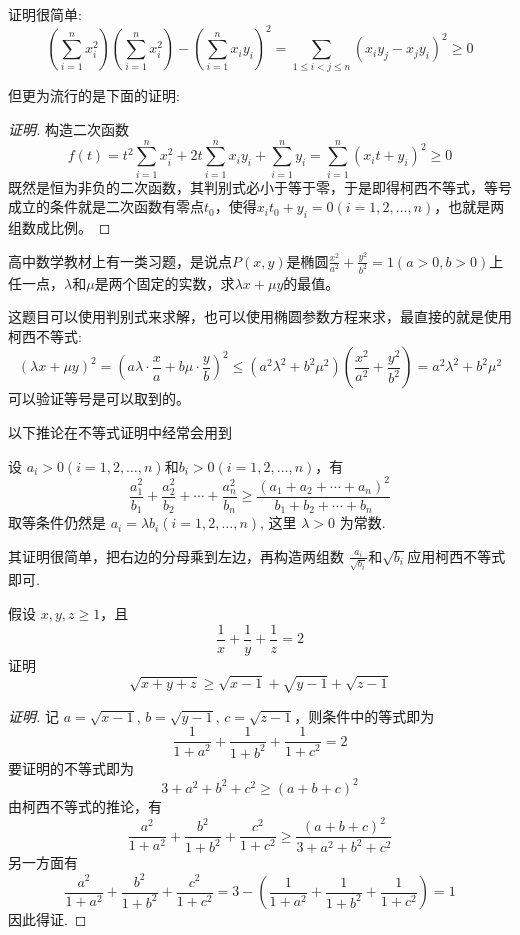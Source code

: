 证明很简单:
\begin{equation*}
  \left( \sum_{i=1}^nx_i^2 \right) \left( \sum_{i=1}^nx_i^2 \right) - \left( \sum_{i=1}^nx_iy_i \right)^2 = \sum_{1 \leqslant i < j \leqslant n}(x_iy_j-x_jy_i)^2 \geqslant 0
\end{equation*}

但更为流行的是下面的证明:

\begin{proof}[证明]
  构造二次函数
  \begin{equation*}
  f(t)=t^2\sum_{i=1}^nx_i^2+2t\sum_{i=1}^nx_iy_i+\sum_{i=1}^ny_i=\sum_{i=1}^n(x_it+y_i)^2 \geqslant 0
  \end{equation*}
 既然是恒为非负的二次函数，其判别式必小于等于零，于是即得柯西不等式，等号成立的条件就是二次函数有零点$t_0$，使得$x_it_0+y_i=0(i=1,2,\ldots,n)$，也就是两组数成比例。
\end{proof}

\begin{example}
  高中数学教材上有一类习题，是说点$P(x,y)$是椭圆$\frac{x^2}{a^2}+\frac{y^2}{b^2}=1(a>0, b>0)$上任一点，$\lambda$和$\mu$是两个固定的实数，求$\lambda x + \mu y$的最值。

  这题目可以使用判别式来求解，也可以使用椭圆参数方程来求，最直接的就是使用柯西不等式:
  \begin{equation*}
    (\lambda x + \mu y)^2 = (a\lambda \cdot \frac{x}{a} + b\mu \cdot \frac{y}{b})^2 \leqslant (a^2\lambda^2+b^2\mu^2)(\frac{x^2}{a^2}+\frac{y^2}{b^2}) = a^2\lambda^2+b^2\mu^2
  \end{equation*}
  可以验证等号是可以取到的。
\end{example}

以下推论在不等式证明中经常会用到
\begin{inference}
  设 $a_{i}>0(i=1,2,\ldots,n)$和$b_i>0(i=1,2,\ldots,n)$，有
  \[ \frac{a_1^2}{b_1}+\frac{a_2^2}{b_2}+\cdots+\frac{a_n^2}{b_n} \geqslant \frac{(a_1+a_2+\cdots+a_n)^{2 }}{b_{1}+b_2+\cdots+b_n} \]
  取等条件仍然是 $a_i=\lambda b_i(i=1,2,\ldots,n)$, 这里 $\lambda >0$ 为常数.
\end{inference}
其证明很简单，把右边的分母乘到左边，再构造两组数 $\frac{a_i}{\sqrt{b_i}}$和$\sqrt{b_i}$应用柯西不等式即可.

\begin{example}
  假设 $x,y,z \geqslant 1$，且
  \[ \frac{1}{x} + \frac{1}{y} + \frac{1}{z} = 2 \]
  证明
  \[ \sqrt{x+y+z} \geqslant \sqrt{x-1} + \sqrt{y-1} + \sqrt{z-1} \]
  \begin{proof}[证明]
    记 $a=\sqrt{x-1}$, $b=\sqrt{y-1}$, $c=\sqrt{z-1}$，则条件中的等式即为
    \[ \frac{1}{1+a^2} + \frac{1}{1+b^2} + \frac{1}{1+c^2} = 2 \]
    要证明的不等式即为
    \[ 3+a^2+b^2+c^2 \geqslant (a+b+c)^2 \]
    由柯西不等式的推论，有
    \[ \frac{a^2}{1+a^2} + \frac{b^2}{1+b^2} + \frac{c^2}{1+c^2} \geqslant \frac{(a+b+c)^{2}}{3+a^2+b^2+c^2} \]
    另一方面有
    \[ \frac{a^2}{1+a^2} + \frac{b^2}{1+b^2} + \frac{c^2}{1+c^2} = 3-\left( \frac{1}{1+a^2} + \frac{1}{1+b^2} + \frac{1}{1+c^2} \right) = 1 \]
    因此得证.
  \end{proof}
\end{example}


